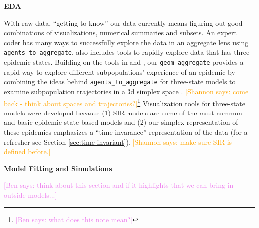 \documentclass[
  shortnames]{jss}
\begin{document}
\textbf{EDA}

With raw data, ``getting to know'' our data currently means figuring out
good combinations of visualizations, numerical summaries and subsets. An
expert coder has many ways to successfully explore the data in an
aggregate lens using \texttt{agents\_to\_aggregate}. 
also includes tools to rapidly explore data that has three epidemic
states. Building on the tools in  and , our
\texttt{geom\_aggregate} provides a rapid way to explore different
subpopulations' experience of an epidemic by combining the ideas behind
\texttt{agents\_to\_aggregate} for three-state models to examine
subpopulation trajectories in a 3d simplex space
\citep{Wickham2016, Hamilton2018}.
\textcolor{orange}{[Shannon says: come back - think about spaces and trajectories?]}\footnote{\textcolor{violet}{[Ben says: what does this note mean?]}}
Visualization tools for three-state models were developed because (1)
SIR models are some of the most common and basic epidemic state-based
models and (2) our simplex representation of these epidemics emphasizes
a ``time-invarance'' representation of the data (for a refresher see
Section \ref{sec:time-invariant}).
\textcolor{orange}{[Shannon says: make sure SIR is defined before.]}

\textbf{Model Fitting and Simulations}

\textcolor{violet}{[Ben says: think about this section and if it highlights that we can bring in outside models...]}
\end{document}
